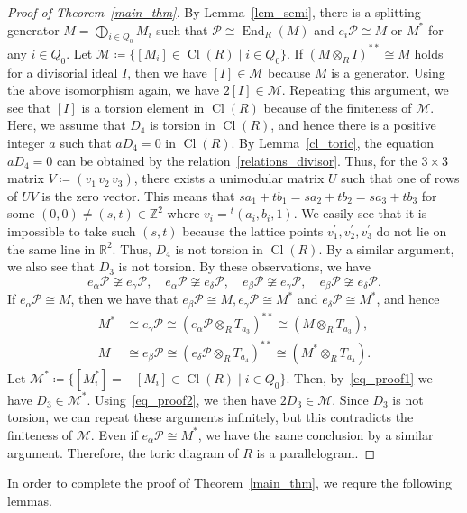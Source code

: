 \documentclass[ALCO,ThmDefs,Unicode]{cedram}
\newcommand{\calM}{\mathcal{M}}
\newcommand{\calP}{\mathcal{P}}
\newcommand{\ZZ}{\mathbb{Z}}
\newcommand{\RR}{\mathbb{R}}
\DeclareMathOperator{\Cl}{Cl}
\DeclareMathOperator{\End}{End}
\begin{document}
\begin{proof}[Proof of Theorem~\ref{main_thm}]
By Lemma~\ref{lem_semi}, there is a splitting generator $M=\bigoplus_{i\in Q_0}M_i$ such that $\calP\cong\End_R(M)$ and $e_i\calP\cong M$ or $M^*$ for any $i\in Q_0$. Let $\calM\coloneqq\{[M_i]\in\Cl(R)\mid i\in Q_0\}$. If $(M\otimes_RI)^{**}\cong M$ holds for a divisorial ideal $I$, then we have $[I]\in\calM$ because $M$ is a generator. Using the above isomorphism again, we have $2[I]\in\calM$. Repeating this argument, we see that $[I]$ is a torsion element in $\Cl(R)$ because of the finiteness of $\calM$. Here, we assume that $D_4$ is torsion in $\Cl(R)$, and hence there is a positive integer $a$ such that $aD_4=0$ in $\Cl(R)$. By Lemma~\ref{cl_toric}, the equation $aD_4=0$ can be obtained by the relation~\eqref{relations_divisor}. Thus, for the $3\times 3$ matrix $V\coloneqq(v_1\,v_2\,v_3)$, there exists a unimodular matrix $U$ such that one of rows of $UV$ is the zero vector. This means that $sa_1+tb_1=sa_2+tb_2=sa_3+tb_3$ for some $(0,0){\neq}(s,t)\in\ZZ^2$ where $v_i={}^t(a_i,b_i,1)$. We easily see that it is impossible to take such $(s,t)$ because the lattice points $v_1^\prime,v_2^\prime,v_3^\prime$ do not lie on the same line in $\RR^2$. Thus, $D_4$ is not torsion in $\Cl(R)$. By a similar argument, we also see that $D_3$ is not torsion. By these observations, we have
\[
e_\alpha\calP\not\cong e_\gamma\calP,\quad e_\alpha\calP\not\cong e_\delta\calP,\quad e_\beta\calP\not\cong e_\gamma\calP,\quad e_\beta\calP\not\cong e_\delta\calP.
\]
If $e_\alpha\calP\cong M$, then we have that $e_\beta\calP\cong M, e_\gamma\calP\cong M^*$ and $e_\delta\calP\cong M^*$, and hence
\begin{align}\label{eq_proof1}
M^*&\cong e_\gamma\calP\cong(e_\alpha\calP\otimes_RT_{a_3})^{**}\cong(M\otimes_RT_{a_3}),
\\
\label{eq_proof2}
M&\cong e_\beta\calP\cong(e_\delta\calP\otimes_RT_{a_4})^{**}\cong(M^*\otimes_RT_{a_4}).
\end{align}
Let $\calM^*\coloneqq\{[M_i^*]=-[M_i]\in\Cl(R)\mid i\in Q_0\}$. Then, by~\eqref{eq_proof1} we have $D_3\in\calM^*$. Using~\eqref{eq_proof2}, we then have $2D_3\in\calM$. Since $D_3$ is not torsion, we can repeat these arguments infinitely, but this contradicts the finiteness of $\calM$. Even if $e_\alpha\calP\cong M^*$, we have the same conclusion by a similar argument. Therefore, the toric diagram of $R$ is a parallelogram.
\end{proof}


In order to complete the proof of Theorem~\ref{main_thm}, we requre the following lemmas.
\end{document}
